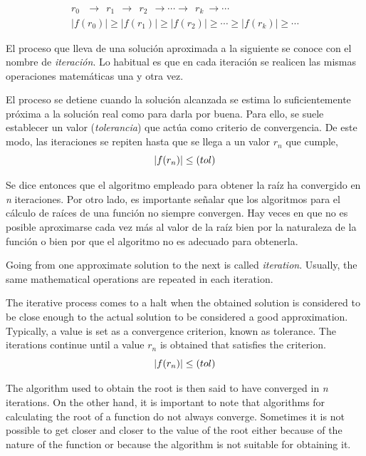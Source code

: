 \begin{align*}
r_0\ \ \  \rightarrow \  \ r_1  \ \ \rightarrow \ \ r_2 \ \ \rightarrow \cdots \rightarrow \ \ r_k \ \rightarrow \cdots\\
\vert f(r_0)\vert \ge \vert f(r_1)\vert \ge \vert f(r_2)\vert \ge \cdots \ge \vert f(r_k)\vert \ge \cdots
\end{align*}
\begin{paracol}{2}
El proceso que lleva de una solución aproximada a la siguiente se conoce con el nombre de \emph{iteración}. Lo habitual es que en cada iteración se realicen las mismas operaciones matemáticas una y otra vez. 

El proceso se detiene cuando la solución alcanzada se estima lo suficientemente próxima a la solución real como para darla por buena. Para ello, se suele establecer un valor (\emph{tolerancia}) que actúa como criterio de convergencia. De este modo, las iteraciones se repiten hasta que se llega a un valor $r_n$ 	que cumple,
\begin{equation*}
\vert f(r_n) \vert \leq \text(tol)
\end{equation*}

Se dice entonces que el algoritmo empleado para obtener la raíz ha convergido en \emph{n} iteraciones. Por otro lado, es importante señalar que los algoritmos para el cálculo de raíces de una función no siempre convergen. Hay veces en que no es posible aproximarse cada vez más al valor de la raíz bien por la naturaleza de la función o bien por que el algoritmo no es adecuado para obtenerla.
\switchcolumn

Going from one approximate solution to the next is called \emph{iteration}. Usually, the same mathematical operations are repeated in each iteration.

The iterative process comes to a halt when the obtained solution is considered to be close enough to the actual solution to be considered a good approximation. Typically, a value is set as a convergence criterion, known as tolerance. The iterations continue until a value $r_n$ is obtained that satisfies the criterion.
\begin{equation*}
\vert f(r_n) \vert \leq \text(tol)
\end{equation*}

The algorithm used to obtain the root is then said to have converged in \emph{n} iterations. On the other hand, it is important to note that algorithms for calculating the root of a function do not always converge. Sometimes it is not possible to get closer and closer to the value of the root either because of the nature of the function or because the algorithm is not suitable for obtaining it.

\end{paracol}
